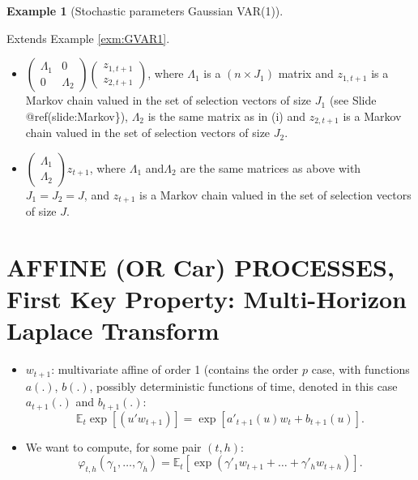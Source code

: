 \documentclass[
  12pt,
]{book}
\providecommand{\tightlist}{%
  \setlength{\itemsep}{0pt}\setlength{\parskip}{0pt}}
\theoremstyle{definition}
\theoremstyle{definition}
\newtheorem{example}{Example}[chapter]
\theoremstyle{definition}
\theoremstyle{definition}
\theoremstyle{remark}
\begin{document}
\begin{example}[Stochastic parameters Gaussian VAR(1)]
\protect\hypertarget{exm:RSVAR}{}\label{exm:RSVAR}

Extends Example \ref{exm:GVAR1}.

\begin{itemize}
\item
  \(\left( \begin{array}{ll} \Lambda_1 & 0 \\ 0 & \Lambda_2 \end{array} \right)\)\(\left( \begin{array}{l} z_{1,t+1} \\ z_{2,t+1} \end{array} \right)\), where \(\Lambda_1\) is a \((n \times J_1)\) matrix and \(z_{1,t+1}\) is a Markov chain valued in the set of selection vectors of size \(J_1\) (see Slide @ref(slide:Markov\}), \(\Lambda_2\) is the same matrix as in (i) and \(z_{2,t+1}\) is a Markov chain valued in the set of selection vectors of size \(J_2\).
\item
  \(\left( \begin{array}{l} \Lambda_1 \\ \Lambda_2 \end{array}\right)z_{t+1}\), where \(\Lambda_1\) and\(\Lambda_2\) are the same matrices as above with \(J_1=J_2=J\), and \(z_{t+1}\) is a Markov chain valued in the set of selection vectors of size \(J\).
\end{itemize}

\end{example}

\hypertarget{affine-or-car-processes-first-key-property-multi-horizon-laplace-transform}{%
\section{AFFINE (OR Car) PROCESSES, First Key Property: Multi-Horizon Laplace Transform}\label{affine-or-car-processes-first-key-property-multi-horizon-laplace-transform}}

\begin{itemize}
\tightlist
\item
  \(w_{t+1}\): multivariate affine of order 1 (contains the order \(p\) case, with functions \(a(.)\), \(b(.)\), possibly deterministic functions of time, denoted in this case \(a_{t+1}(.)\) and \(b_{t+1}(.)\):
  \[
  \mathbb{E}_t \exp[(u'w_{t+1})] = \exp[a'_{t+1}(u)w_t+b_{t+1}(u)].
  \]
\item
  We want to compute, for some pair \((t,h)\):
  \begin{equation}
  \varphi_{t,h}(\gamma_1,\dots,\gamma_h) = \mathbb{E}_t[\exp(\gamma'_1w_{t+1}+\dots+\gamma'_h w_{t+h})].\label{eq:multiLT}
  \end{equation}
\end{itemize}
\end{document}
